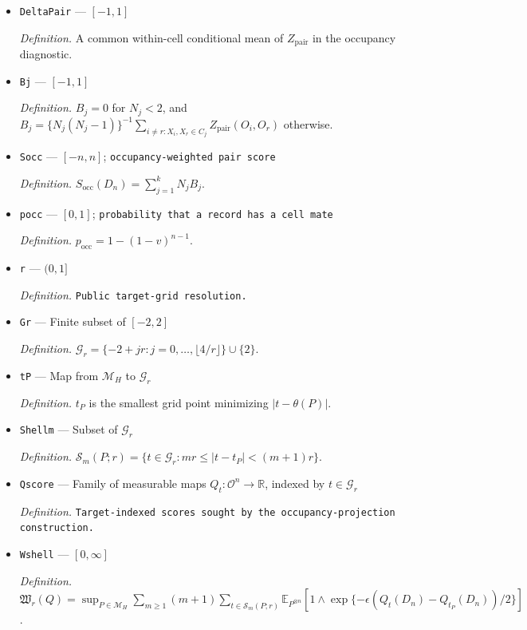 \documentclass{article}
\begin{document}
\begin{itemize}
  \par\smallskip\noindent\emph{Definition.} \texttt{A bounded localized second-\allowbreak{}order projection kernel.}
  \item \texttt{DeltaPair} --- \([-1,1]\)
  \par\smallskip\noindent\emph{Definition.} A common within-cell conditional mean of \(Z_{\mathrm{pair}}\) in the occupancy diagnostic.
  \item \texttt{Bj} --- \([-1,1]\)
  \par\smallskip\noindent\emph{Definition.} \(B_j=0\) for \(N_j<2\), and \(B_j=\{N_j(N_j-1)\}^{-1}\sum_{i\ne r:X_i,X_r\in C_j}Z_{\mathrm{pair}}(O_i,O_r)\) otherwise.
  \item \texttt{Socc} --- \([-n,n]\); \texttt{occupancy-\allowbreak{}weighted pair score}
  \par\smallskip\noindent\emph{Definition.} \(S_{\mathrm{occ}}(D_n)=\sum_{j=1}^kN_jB_j\).
  \item \texttt{pocc} --- \([0,1]\); \texttt{probability that a record has a cell mate}
  \par\smallskip\noindent\emph{Definition.} \(p_{\mathrm{occ}}=1-(1-v)^{n-1}\).
  \item \texttt{r} --- \((0,1]\)
  \par\smallskip\noindent\emph{Definition.} \texttt{Public target-\allowbreak{}grid resolution.}
  \item \texttt{Gr} --- Finite subset of \([-2,2]\)
  \par\smallskip\noindent\emph{Definition.} \(\mathcal G_r=\{-2+jr:j=0,\ldots,\lfloor4/r\rfloor\}\cup\{2\}\).
  \item \texttt{tP} --- Map from \(\mathcal M_H\) to \(\mathcal G_r\)
  \par\smallskip\noindent\emph{Definition.} \(t_P\) is the smallest grid point minimizing \(|t-\theta(P)|\).
  \item \texttt{Shellm} --- Subset of \(\mathcal G_r\)
  \par\smallskip\noindent\emph{Definition.} \(\mathcal S_m(P;r)=\{t\in\mathcal G_r:mr\le|t-t_P|<(m+1)r\}\).
  \item \texttt{Qscore} --- Family of measurable maps \(Q_t:\mathcal O^n\to\mathbb R\), indexed by \(t\in\mathcal G_r\)
  \par\smallskip\noindent\emph{Definition.} \texttt{Target-\allowbreak{}indexed scores sought by the occupancy-\allowbreak{}projection construction.}
  \item \texttt{Wshell} --- \([0,\infty]\)
  \par\smallskip\noindent\emph{Definition.} \(\mathfrak W_r(Q)=\sup_{P\in\mathcal M_H}\sum_{m\ge1}(m+1)\sum_{t\in\mathcal S_m(P;r)}\mathbb E_{P^{\otimes n}}[1\wedge\exp\{-\epsilon(Q_t(D_n)-Q_{t_P}(D_n))/2\}]\).

\end{itemize}
\end{document}
